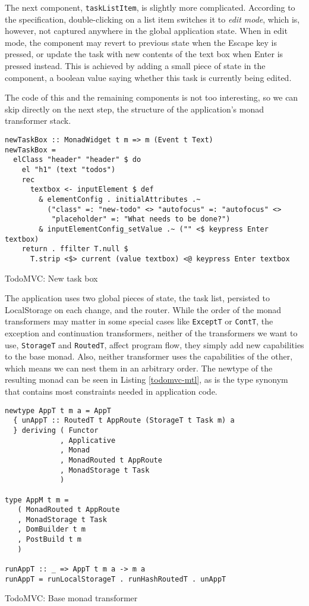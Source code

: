 \documentclass[english,odsaz]{fitthesis}
\begin{document}
The next component, \texttt{taskListItem}, is slightly more complicated. According to the
specification, double-clicking on a list item switches it to \emph{edit mode}, which is,
however, not captured anywhere in the global application state. When in edit
mode, the component may revert to previous state when the Escape key is pressed,
or update the task with new contents of the text box when Enter is pressed
instead. This is achieved by adding a small piece of state in the component, a
boolean value saying whether this task is currently being edited.

The code of this and the remaining components is not too interesting, so we can
skip directly on the next step, the structure of the application's monad
transformer stack.

\begin{listing}[htbp]
\begin{verbatim}
newTaskBox :: MonadWidget t m => m (Event t Text)
newTaskBox =
  elClass "header" "header" $ do
    el "h1" (text "todos")
    rec
      textbox <- inputElement $ def
        & elementConfig . initialAttributes .~
          ("class" =: "new-todo" <> "autofocus" =: "autofocus" <>
           "placeholder" =: "What needs to be done?")
        & inputElementConfig_setValue .~ ("" <$ keypress Enter textbox)
    return . ffilter T.null $
      T.strip <$> current (value textbox) <@ keypress Enter textbox
\end{verbatim}
\caption{TodoMVC: New task box \label{new-task-box}}
\end{listing}

The application uses two global pieces of state, the task list, persisted to
LocalStorage on each change, and the router. While the order of the monad
transformers may matter in some special cases like \texttt{ExceptT} or \texttt{ContT}, the
exception and continuation transformers, neither of the transformers we want to
use, \texttt{StorageT} and \texttt{RoutedT}, affect program flow, they simply add new capabilities
to the base monad. Also, neither transformer uses the capabilities of the other,
which means we can nest them in an arbitrary order. The newtype of the resulting
monad can be seen in Listing \ref{todomvc-mtl}, as is the type synonym that
contains most constraints needed in application code.

\begin{listing}[htbp]
\begin{verbatim}
newtype AppT t m a = AppT
  { unAppT :: RoutedT t AppRoute (StorageT t Task m) a
  } deriving ( Functor
             , Applicative
             , Monad
             , MonadRouted t AppRoute
             , MonadStorage t Task
             )

type AppM t m =
   ( MonadRouted t AppRoute
   , MonadStorage t Task
   , DomBuilder t m
   , PostBuild t m
   )

runAppT :: _ => AppT t m a -> m a
runAppT = runLocalStorageT . runHashRoutedT . unAppT
\end{verbatim}
\caption{TodoMVC: Base monad transformer \label{todomvc-mtl}}
\end{listing}
\end{document}
